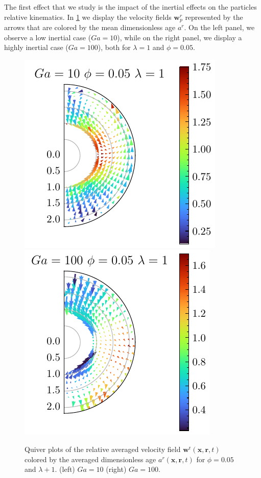 The first effect that we study is the impact of the inertial effects on the particles relative kinematics. 
In \ref{fig:Why_Ga_matter} we display the velocity fields $\textbf{w}_p^r$ represented by the arrows that are colored by the mean dimensionless age $a^r$.  
On the left panel, we observe a low inertial case ($Ga = 10$), while on the right panel, we display a highly inertial case ($Ga=100$), both for $\lambda =1$ and $\phi=0.05$.
\begin{figure}[h!]
    \centering
    \includegraphics[height=0.35\textwidth]{image/HOMOGENEOUS_NEW/Dist/U_rel_l_1_Ga_10_PHI_5.pdf}
    \includegraphics[height=0.35\textwidth]{image/HOMOGENEOUS_NEW/Dist/U_rel_l_1_Ga_100_PHI_5.pdf}
    \caption{
         Quiver plots of the relative averaged velocity field $\textbf{w}^\text{r}(\textbf{x},\textbf{r},t)$ colored by the averaged dimensionless age $a^r(\textbf{x},\textbf{r},t)$ for $\phi = 0.05$ and $\lambda +1$.
         (left) $Ga = 10$ (right) $Ga =100$. }
    \label{fig:Why_Ga_matter}
\end{figure}

